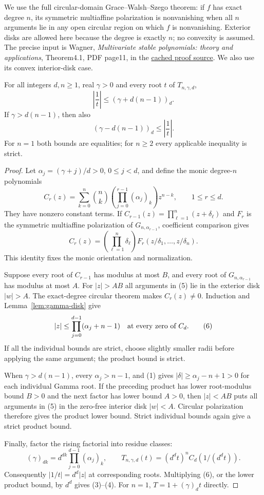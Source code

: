 \documentclass[11pt]{article}
\begin{document}
We use the full circular-domain Grace--Walsh--Szego theorem:
if $f$ has exact degree $n$, its symmetric multiaffine polarization
is nonvanishing when all $n$ arguments lie in any open circular
region on which $f$ is nonvanishing.  Exterior disks are allowed
here because the degree is exactly $n$; no convexity is assumed.
The precise input is Wagner, \emph{Multivariate stable polynomials:
theory and applications}, Theorem4.1, PDF page11, in the
\href{sources/wagner-multivariate-stable-polynomials-2011.pdf}
{cached proof source}.  We also use its convex interior-disk case.

\begin{theorem}\label{thm:product-annulus}
For all integers $d,n\ge1$, real $\gamma>0$ and every root $t$ of
$T_{n,\gamma,d}$,
\[
 \left|\frac1t\right|\le(\gamma+d(n-1))_d.                      \tag{3}
\]
If $\gamma>d(n-1)$, then also
\[
 (\gamma-d(n-1))_d\le\left|\frac1t\right|.                      \tag{4}
\]
For $n=1$ both bounds are equalities; for $n\ge2$ every applicable
inequality is strict.
\end{theorem}
\begin{proof}
Let $\alpha_j=(\gamma+j)/d>0$, $0\le j<d$, and define the monic
degree-$n$ polynomials
\[
 C_r(z)=\sum_{k=0}^n\binom nk
             \left(\prod_{j=0}^{r-1}(\alpha_j)_k\right)z^{n-k},
 \qquad 1\le r\le d.
\]
They have nonzero constant terms.
If $C_{r-1}(z)=\prod_{\ell=1}^n(z+\delta_\ell)$ and $F_r$
is the symmetric multiaffine polarization of $G_{n,\alpha_{r-1}}$,
coefficient comparison gives
\[
 C_r(z)=\left(\prod_{\ell=1}^n\delta_\ell\right)
          F_r(z/\delta_1,\ldots,z/\delta_n).                  \tag{5}
\]
This identity fixes the monic orientation and normalization.

Suppose every root of $C_{r-1}$ has modulus at most $B$, and
every root of $G_{n,\alpha_{r-1}}$ has modulus at most $A$.
For $|z|>AB$ all arguments in (5) lie in the exterior disk $|w|>A$.
The exact-degree circular theorem makes $C_r(z)\ne0$.
Induction and Lemma~\ref{lem:gamma-disk} give
\[
 |z|\le\prod_{j=0}^{d-1}(\alpha_j+n-1)
             \quad\hbox{at every zero of }C_d.               \tag{6}
\]
If all the individual bounds are strict, choose slightly smaller
radii before applying the same argument; the product bound is strict.

When $\gamma>d(n-1)$, every $\alpha_j>n-1$, and (1) gives
$|\delta|\ge\alpha_j-n+1>0$ for each individual Gamma root.
If the preceding product has lower root-modulus bound $B>0$ and
the next factor has lower bound $A>0$, then $|z|<AB$ puts all
arguments in (5) in the zero-free interior disk $|w|<A$.
Circular polarization therefore gives the product lower bound.
Strict individual bounds again give a strict product bound.

Finally, factor the rising factorial into residue classes:
\[
 (\gamma)_{dk}=d^{dk}\prod_{j=0}^{d-1}(\alpha_j)_k,\qquad
 T_{n,\gamma,d}(t)=(d^dt)^nC_d(1/(d^dt)).
\]
Consequently $|1/t|=d^d|z|$ at corresponding roots.
Multiplying (6), or the lower product bound, by $d^d$ gives
(3)--(4).  For $n=1$, $T=1+(\gamma)_dt$ directly.
\end{proof}
\end{document}
